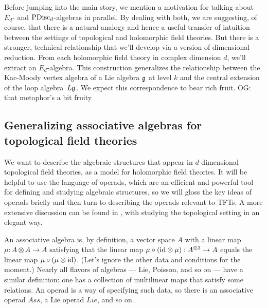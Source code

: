 \documentclass[11pt]{amsart}
\def\owen#1{{\textcolor{violet!50!black}{OG: {#1}}}}
\begin{document}
Before jumping into the main story, we mention a motivation for talking about $E_d$- and ${\rm PDisc}_d$-algebras in parallel.
By dealing with both, we are suggesting, of course, that there is a natural analogy and hence a useful transfer of intuition between the settings of topological and holomorphic field theories.
But there is a stronger, technical relationship that we'll develop via a version of dimensional reduction.
From each holomorphic field theory in complex dimension $d$, 
we'll extract an $E_d$-algebra.
This construction generalizes the relationship between the Kac-Moody vertex algebra of a Lie algebra $\mathfrak g$ at level $k$ and the central extension of the loop algebra~$L\mathfrak g$.
We expect this correspondence to bear rich fruit.
\owen{that metaphor's a bit fruity}

\subsection{Generalizing associative algebras for topological field theories}

We want to describe the algebraic structures that appear in $d$-dimensional topological field theories,
as a model for holomorphic field theories.
It will be helpful to use the language of operads, which are an efficient and powerful tool for defining and studying algebraic structures,
so we will gloss the key ideas of operads briefly and then turn to describing the operads relevant to TFTs.
A more extensive discussion can be found in \cite{CG1}, with \cite{ES} studying the topological setting in an elegant way.

An associative algebra is, by definition, a vector space $A$ with a linear map $\mu: A\otimes A \to A$ satisfying that the linear map $\mu \circ ({\rm id} \otimes \mu): A^{\otimes 3} \to A$ equals the linear map $\mu \circ (\mu \otimes {\rm id})$.
(Let's ignore the other data and conditions for the moment.)
Nearly all flavors of algebras --- Lie, Poisson, and so on --- have a similar definition:
one has a collection of multilinear maps that satisfy some relations.
An operad is a way of specifying such data, so there is an associative operad $Ass$,
a Lie operad $Lie$, and so on.
\end{document}
